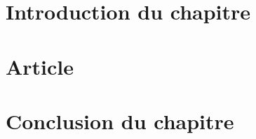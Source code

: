 \section*{Introduction du chapitre \thechapter}

\newpage
\section{Article} 
\label{sec:article}
















			
\newpage	
			
\section*{Conclusion du chapitre \thechapter}

